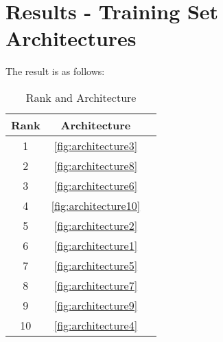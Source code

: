 \section{Results - Training Set Architectures}

The result is as follows:

\begin{table}[h]
    \label{table:survey}
    \centering
    \caption{Rank and Architecture}
    \begin{tabular}{ |c|c|c| } 
    \hline
    Rank & Architecture \\
    \hline
    1 & \ref{fig:architecture3}\\
    2 & \ref{fig:architecture8}\\
    3 & \ref{fig:architecture6}\\
    4 & \ref{fig:architecture10}\\
    5 & \ref{fig:architecture2}\\
    6 & \ref{fig:architecture1}\\
    7 & \ref{fig:architecture5}\\
    8 & \ref{fig:architecture7}\\
    9 & \ref{fig:architecture9}\\
    10 & \ref{fig:architecture4}\\
    \hline
    \end{tabular}
\end{table}
